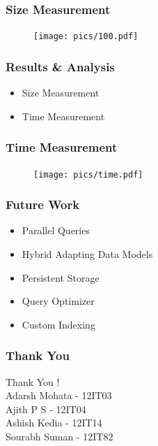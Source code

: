 \documentclass[14pt,xcolor=dvipsnames, aspectratio=169]{beamer}
\begin{document}
\begin{frame}
 \frametitle{Size Measurement}
 \begin{figure}
 \centering
 \texttt{[image: pics/100.pdf]}
 \end{figure}
\end{frame}

\begin{frame}
 \frametitle{Results \& Analysis}
 \begin{itemize}
  \item Size Measurement
  \item Time Measurement
 \end{itemize}
\end{frame}

\begin{frame}
 \frametitle{Time Measurement}
 \begin{figure}
 \centering
 \texttt{[image: pics/time.pdf]}
 \end{figure}
\end{frame}

\begin{frame}
 \frametitle{Future Work}
 \begin{itemize}
  \item<1-> Parallel Queries
  \item<2-> Hybrid Adapting Data Models
  \item<3-> Persistent Storage
  \item<4-> Query Optimizer
  \item<5-> Custom Indexing
 \end{itemize}

\end{frame}


\begin{frame}
\frametitle{Thank You}
 \huge
 \centering
 \vspace{1cm}
 Thank You ! \\
 \vspace{1.5cm}
 \flushright 
 \flushbottom
 \small
 Adarsh Mohata - 12IT03 \\
 Ajith P S - 12IT04\\
 Ashish Kedia - 12IT14 \\
 Sourabh Suman - 12IT82 \\
\end{frame}
\end{document}
